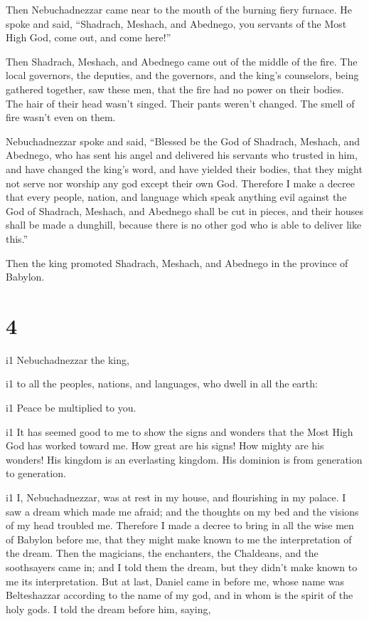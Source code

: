  Then Nebuchadnezzar came near to the mouth of the burning
fiery furnace. He spoke and said, ``Shadrach, Meshach, and Abednego, you
servants of the Most High God, come out, and come here!''

Then Shadrach, Meshach, and Abednego came out of the middle of the fire.
 The local governors, the deputies, and the governors, and
the king's counselors, being gathered together, saw these men, that the
fire had no power on their bodies. The hair of their head wasn't singed.
Their pants weren't changed. The smell of fire wasn't even on them.

 Nebuchadnezzar spoke and said, ``Blessed be the God of
Shadrach, Meshach, and Abednego, who has sent his angel and delivered
his servants who trusted in him, and have changed the king's word, and
have yielded their bodies, that they might not serve nor worship any god
except their own God.  Therefore I make a decree that every
people, nation, and language which speak anything evil against the God
of Shadrach, Meshach, and Abednego shall be cut in pieces, and their
houses shall be made a dunghill, because there is no other god who is
able to deliver like this.''

 Then the king promoted Shadrach, Meshach, and Abednego in
the province of Babylon.

\hypertarget{section-3}{%
\section{4}\label{section-3}}

i1 Nebuchadnezzar the king,

i1 to all the peoples, nations, and languages, who dwell in all the
earth:

i1 Peace be multiplied to you.

i1 It has seemed good to me to show the signs and wonders
that the Most High God has worked toward me.  How great are
his signs! How mighty are his wonders! His kingdom is an everlasting
kingdom. His dominion is from generation to generation.

i1 I, Nebuchadnezzar, was at rest in my house, and
flourishing in my palace.  I saw a dream which made me
afraid; and the thoughts on my bed and the visions of my head troubled
me.  Therefore I made a decree to bring in all the wise men
of Babylon before me, that they might make known to me the
interpretation of the dream.  Then the magicians, the
enchanters, the Chaldeans, and the soothsayers came in; and I told them
the dream, but they didn't make known to me its interpretation.
 But at last, Daniel came in before me, whose name was
Belteshazzar according to the name of my god, and in whom is the spirit
of the holy gods. I told the dream before him, saying,

